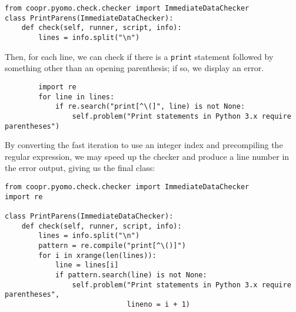 \documentclass{article}
\begin{document}
\begin{verbatim}
from coopr.pyomo.check.checker import ImmediateDataChecker
class PrintParens(ImmediateDataChecker):
    def check(self, runner, script, info):
        lines = info.split("\n")
\end{verbatim}

Then, for each line, we can check if there is a \verb!print! statement followed by something other than an opening parenthesis; if so, we display an error.

\begin{verbatim}
        import re
        for line in lines:
            if re.search("print[^\(]", line) is not None:
                self.problem("Print statements in Python 3.x require parentheses")
\end{verbatim}

By converting the fast iteration to use an integer index and precompiling the regular expression, we may speed up the checker and produce a line number in the error output, giving us the final class:

\begin{verbatim}
from coopr.pyomo.check.checker import ImmediateDataChecker
import re

class PrintParens(ImmediateDataChecker):
    def check(self, runner, script, info):
        lines = info.split("\n")
        pattern = re.compile("print[^\()]")
        for i in xrange(len(lines)):
            line = lines[i]
            if pattern.search(line) is not None:
                self.problem("Print statements in Python 3.x require parentheses", 
                             lineno = i + 1)
\end{verbatim}
\end{document}
